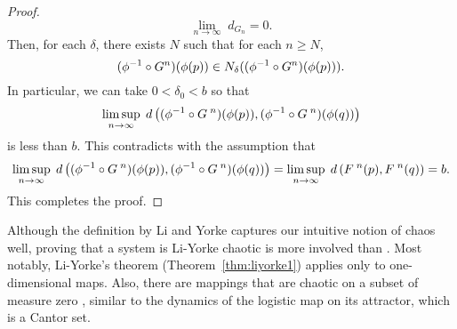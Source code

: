 \documentclass[10pt,draft,twoside]{book}
\begin{document}
\begin{theorem}
\begin{proof}
  \begin{equation*}
    \lim\limits_{n \to \infty}\; d_{G_n} = 0.
  \end{equation*}
  Then, for each $\delta$, there exists $N$ such that for each $n \geq N$,
  \begin{equation*}
    (\phi^{-1} \circ G^n)(\phi(p)) \in N_{\delta}((\phi^{-1} \circ G^n)(\phi(p))).
  \end{equation*}
  In particular, we can take $0 < \delta_0 < b$ so that
  \begin{equation*}
    \limsup\limits_{n \to \infty}\; d\left( (\phi^{-1}\circ G^{\;n})(\phi(p)) , (\phi^{-1}\circ G^{\;n})(\phi(q)) \right)
  \end{equation*}
  is less than $b$.
  This contradicts with the assumption that
  \begin{equation*}
    \limsup\limits_{n \to \infty}\; d\left( (\phi^{-1}\circ G^{\;n})(\phi(p)) , (\phi^{-1}\circ G^{\;n})(\phi(q)) \right)
    = \limsup\limits_{n \to \infty}\; d\left( F^{\;n}(p) , F^{\;n}(q) \right) 
    = b.
    \end{equation*}
  This completes the proof.
  \end{proof}
  \label{thm:liyorke-conj}
\end{theorem}
Although the definition by Li and Yorke captures our intuitive notion of chaos well, proving that a system is Li-Yorke chaotic is more involved than .
Most notably, Li-Yorke's theorem (Theorem~\ref{thm:liyorke1}) applies only to one-dimensional maps.
Also, there are mappings that are chaotic on a subset of measure zero \citep{martelli}, similar to the dynamics of the logistic map on its attractor, which is a Cantor set.
\end{document}
